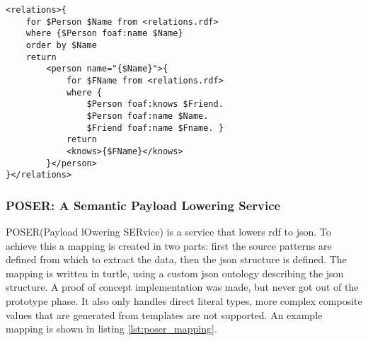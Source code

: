 \begin{lstlisting}[caption={Example of \acrshort{xsparql} lowering}, label={lst:xsparql_lowering}, captionpos=b, basicstyle=\small]
<relations>{
    for $Person $Name from <relations.rdf>
    where {$Person foaf:name $Name}
    order by $Name
    return
        <person name="{$Name}">{
            for $FName from <relations.rdf>
            where {
                $Person foaf:knows $Friend.
                $Person foaf:name $Name.
                $Friend foaf:name $Fname. }
            return
            <knows>{$FName}</knows>
        }</person>
}</relations>
\end{lstlisting}


\subsubsection{POSER: A Semantic Payload Lowering Service \citep{poser}}
POSER(Payload lOwering SERvice) is a service that lowers \acrshort{rdf} to \acrshort{json}. To achieve this a mapping is created in two parts: first the source patterns are defined from which to extract the data, then the json structure is defined. The mapping is written in turtle, using a custom json ontology describing the json structure. A proof of concept implementation was made, but never got out of the prototype phase. It also only handles direct literal types, more complex composite values that are generated from templates are not supported. An example mapping is shown in listing \ref{lst:poser_mapping}.

